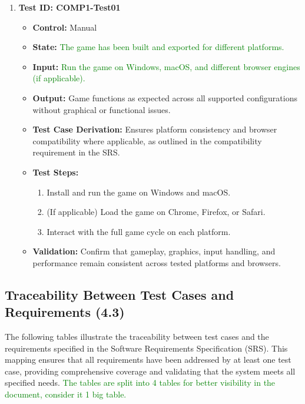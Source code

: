 \documentclass[12pt]{article}
\newcommand{\added}[1]{\textcolor{green}{#1}}
\begin{document}
\begin{enumerate}
    \item \textbf{Test ID: COMP1-Test01}
    \begin{itemize}
        \item \textbf{Control:} Manual
        \item \textbf{State:} \added{The game has been built and exported for different platforms.}
        \item \textbf{Input:} \added{Run the game on Windows, macOS, and different browser engines (if applicable).}
        \item \textbf{Output:} Game functions as expected across all supported configurations without graphical or functional issues.
        \item \textbf{Test Case Derivation:} Ensures platform consistency and browser compatibility where applicable, as outlined in the compatibility requirement in the SRS.
        \item \textbf{Test Steps:}
        \begin{enumerate}
            \item Install and run the game on Windows and macOS.
            \item (If applicable) Load the game on Chrome, Firefox, or Safari.
            \item Interact with the full game cycle on each platform.
        \end{enumerate}
        \item \textbf{Validation:} Confirm that gameplay, graphics, input handling, and performance remain consistent across tested platforms and browsers.
    \end{itemize}
\end{enumerate}

\subsection{Traceability Between Test Cases and Requirements (4.3)}

The following tables illustrate the traceability between test cases and the requirements specified in the Software Requirements Specification (SRS). This mapping ensures that all requirements have been addressed by at least one test case, providing comprehensive coverage and validating that the system meets all specified needs. \added{The tables are split into 4 tables for better visibility in the document, consider it 1 big table.}
\end{document}
